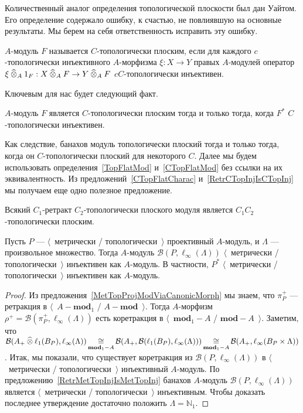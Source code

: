 Количественный аналог определения топологической плоскости был дан Уайтом. Его
определение содержало ошибку, к счастью, не повлиявшую на основные результаты.
Мы берем на себя ответственность исправить эту ошибку.

\begin{definition}\label{CTopFlatMod}
$A$-модуль $F$ называется $C$-топологически плоским, если для каждого
$c$-топологически инъективного $A$-морфизма $\xi:X\to Y$ правых $A$-модулей
оператор $\xi\mathbin{\widehat{\otimes}}_{A} 1_F:X\mathbin{\widehat{\otimes}}_{A} F\to Y\mathbin{\widehat{\otimes}}_{A} F$
$cC$-топологически инъективен.
\end{definition}

Ключевым для нас будет следующий факт.

\begin{proposition}\label{CTopFlatCharac}
$A$-модуль $F$ является $C$-топологически плоским тогда и только тогда, когда
$F^*$ $C$-топологически инъективен.
\end{proposition}

Как следствие, банахов модуль топологически плоский тогда и только тогда, когда
он $C$-топологически плоский для некоторого $C$. Далее мы будем использовать
определения~\ref{TopFlatMod} и~\ref{CTopFlatMod} без ссылки на их
эквивалентность. Из предложений~\ref{CTopFlatCharac}
и~\ref{RetrCTopInjIsCTopInj} мы получаем еще одно полезное предложение.

\begin{proposition}\label{RetrCTopFlatIsCTopFlat} Всякий $C_1$-ретракт
$C_2$-топологически плоского модуля является $C_1C_2$-топологически плоским.
\end{proposition}

\begin{proposition}\label{DualMetTopProjIsMetrInj} Пусть $P$ ---
$\langle$~метрически / топологически~$\rangle$ проективный $A$-модуль, и
$\Lambda$ --- произвольное множество. Тогда $A$-модуль
$\mathcal{B}(P,\ell_\infty(\Lambda))$ $\langle$~метрически /
топологически~$\rangle$ инъективен как $A$-модуль. В частности, $P^*$
$\langle$~метрически / топологически~$\rangle$ инъективен как $A$-модуль.
\end{proposition}
\begin{proof} Из предложения~\ref{MetTopProjModViaCanonicMorph} мы знаем, что
$\pi_P^+$ --- ретракция в $\langle$~$A-\mathbf{mod}_1$ /
$A-\mathbf{mod}$~$\rangle$. Тогда $A$-морфизм
$\rho^+=\mathcal{B}(\pi_P^+,\ell_\infty(\Lambda))$ есть коретракция в
$\langle$~$\mathbf{mod}_1-A$ / $\mathbf{mod}-A$~$\rangle$. Заметим, что
$\mathcal{B}(A_+\mathbin{\widehat{\otimes}}\ell_1(B_P),\ell_\infty(\Lambda))
\mathop{\mathbin{\cong}}\limits_{\mathbf{mod}_1-A}
\mathcal{B}(A_+,\mathcal{B}(\ell_1(B_P),\ell_\infty(\Lambda)))
\mathop{\mathbin{\cong}}\limits_{\mathbf{mod}_1-A}
\mathcal{B}(A_+,\ell_\infty(B_P\times\Lambda))$.
Итак, мы показали, что существует коретракция из
$\mathcal{B}(P,\ell_\infty(\Lambda))$ в $\langle$~метрически /
топологически~$\rangle$ инъективный $A$-модуль. По
предложению~\ref{RetrMetTopInjIsMetTopInj} банахов $A$-модуль
$\mathcal{B}(P,\ell_\infty(\Lambda))$ является $\langle$~метрически /
топологически~$\rangle$ инъективным. Чтобы доказать последнее утверждение
достаточно положить $\Lambda=\mathbb{N}_1$.
\end{proof}

